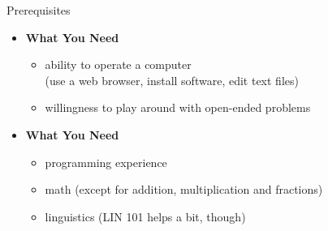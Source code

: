 \documentclass[professionalfonts, xcolor={usenames,svgnames,x11names,table}]{beamer}
\begin{document}
\begin{frame}{Prerequisites}
    \begin{itemize}
        \item \textbf{What You Need}
            \begin{itemize}
                \item ability to operate a computer\\
                    (use a web browser, install software, edit text files)
                \item willingness to play around with open-ended problems
            \end{itemize}
        \item \textbf{What You  Need}
            \begin{itemize}
                \item programming experience
                \item math (except for addition, multiplication and fractions)
                \item linguistics (LIN 101 helps a bit, though)
            \end{itemize}
    \end{itemize}
\end{frame}
\end{document}
